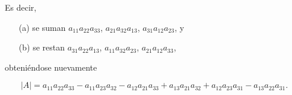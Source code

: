 \documentclass[handout]{beamer} %
\begin{document}
\begin{frame}
    Es decir,
		\begin{enumerate}
			\item[(a)]  se suman  $a_{11}a_{22}a_{33}$, $a_{21}a_{32}a_{13}$, $a_{31}a_{12}a_{23}$,  y
			\item[(b)]  se restan  $a_{31}a_{22}a_{13}$,  $a_{11}a_{32}a_{23}$,  $a_{21}a_{12}a_{33}$, 
        \end{enumerate}
        \pause
        obteniéndose nuevamente 

        \begin{equation*}
            |A| =a_{11}a_{22}a_{33}- a_{11}a_{23}a_{32} 
            - a_{12}a_{21}a_{33}+ a_{13}a_{21}a_{32}+ a_{12}a_{23}a_{31}
            - a_{13}a_{22}a_{31}.
            \end{equation*} 

        \vskip 2cm

        
\end{frame}
\end{document}
